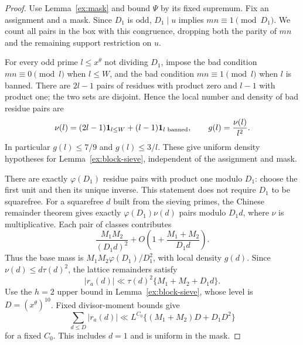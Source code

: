 \begin{proof}
Use Lemma~\ref{ex:mask} and bound $\Psi$ by its fixed supremum.
Fix an assignment and a mask. Since $D_1$ is odd, $D_1\mid u$
implies $mn\equiv1\pmod{D_1}$. We count all pairs in the box with
this congruence, dropping both the parity of $mn$ and the remaining
support restriction on $u$.

For every odd prime $l\le x^\theta$ not dividing $D_1$, impose
the bad condition $mn\equiv0\pmod l$ when $l\le W$, and the bad
condition $mn\equiv1\pmod l$ when $l$ is banned. There are
$2l-1$ pairs of residues with product zero and $l-1$ with product
one; the two sets are disjoint. Hence the local number and density
of bad residue pairs are
\begin{equation}\label{ex:local-density}
 \nu(l)=(2l-1)\mathbf{1}_{l\le W}+(l-1)\mathbf{1}_{l\text{ banned}},
 \qquad g(l)=\frac{\nu(l)}{l^2}.
\end{equation}
In particular $g(l)\le7/9$ and $g(l)\le3/l$. These give uniform
density hypotheses for Lemma~\ref{ex:block-sieve}, independent of
the assignment and mask.

There are exactly $\varphi(D_1)$ residue pairs with product one
modulo $D_1$: choose the first unit and then its unique inverse.
This statement does not require $D_1$ to be squarefree. For a
squarefree $d$ built from the sieving primes, the Chinese remainder
theorem gives exactly $\varphi(D_1)\nu(d)$ pairs modulo $D_1d$,
where $\nu$ is multiplicative. Each pair of classes contributes
\[
 \frac{M_1M_2}{(D_1d)^2}
  +O\left(1+\frac{M_1+M_2}{D_1d}\right).
\]
Thus the base mass is
$M_1M_2\varphi(D_1)/D_1^2$, with local density $g(d)$.
Since $\nu(d)\le d\tau(d)^2$, the lattice remainders satisfy
\[
 |r_a(d)|\ll\tau(d)^2\{M_1+M_2+D_1d\}.
\]
Use the $h=2$ upper bound in Lemma~\ref{ex:block-sieve}, whose
level is $D=(x^\theta)^{10}$. Fixed divisor-moment bounds give
\begin{equation}\label{ex:box-error}
 \sum_{d\le D}|r_a(d)|
 \ll L^{C_0}\{(M_1+M_2)D+D_1D^2\}
\end{equation}
for a fixed $C_0$. This includes $d=1$ and is uniform in the mask.


\end{proof}
